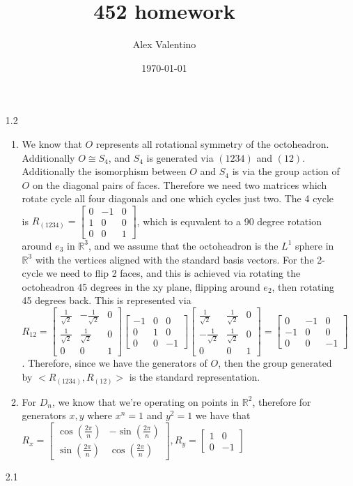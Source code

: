 \documentclass[12pt, letterpaper]{article}
\date{\today}
\author{Alex Valentino}
\title{452 homework}
\newcommand{\R}{\mathbb{R}}
\begin{document}
\begin{enumerate}
	\item[1.2]
	\begin{enumerate}
		\item We know that $O$ represents all rotational symmetry 
		of the octoheadron.  Additionally $O \cong S_4$, and 
		$S_4$ is generated via $(1234)$ and $(12)$.  Additionally 
		the isomorphism between $O$ and $S_4$ is via the 
		group action of $O$ on the diagonal pairs of faces.  
		Therefore we need two matrices which rotate cycle all 
		four diagonals and one which cycles just two.  
		The 4 cycle is $R_{(1234)} = \begin{bmatrix}
		0 & -1 & 0\\ 1 & 0 & 0\\ 0 & 0 & 1
\end{bmatrix}		 $, which is equvalent to a 90 degree rotation around 
$e_3$ in $\R^3$, and we assume that the octoheadron is the 
$L^1$ sphere in $\R^3$ with the vertices aligned with the standard basis vectors.  For the 2-cycle we need to flip 2 faces, and this 
is achieved via rotating the octoheadron 45 degrees in the 
xy plane, flipping around $e_2$, then rotating 45 degrees back. 
This is represented via
$R_{12} = \begin{bmatrix}
\frac{1}{\sqrt{2}} & -\frac{1}{\sqrt{2}} & 0 \\
\frac{1}{\sqrt{2}} & \frac{1}{\sqrt{2}} & 0\\
0 & 0 & 1
\end{bmatrix} \begin{bmatrix}
-1 & 0 & 0\\ 
0 & 1 & 0\\
0 & 0 & -1
\end{bmatrix}\begin{bmatrix}

\frac{1}{\sqrt{2}} & \frac{1}{\sqrt{2}} & 0 \\
-\frac{1}{\sqrt{2}} & \frac{1}{\sqrt{2}} & 0\\
0 & 0 & 1
\end{bmatrix} = \begin{bmatrix}
0 & -1 & 0\\ -1 & 0 & 0\\ 0 & 0 & -1
\end{bmatrix} $.  Therefore, since we have the generators of $O$, 
then the group generated by $<R_{(1234)}, R_{(12)}>$ is the 
standard representation.  
		\item For $D_n$, we know that we're operating on points in 
		$\R^2$, therefore for generators $x,y$ where 
		$x^n = 1$ and $y^2 =1$ we have that 
		$R_x = \begin{bmatrix}
		\cos(\frac{2\pi}{n}) & -\sin(\frac{2\pi}{n})\\
		\sin(\frac{2\pi}{n}) & \cos(\frac{2\pi}{n})
\end{bmatrix}, R_y = \begin{bmatrix}
1 & 0\\ 0 & -1
\end{bmatrix} $
	\end{enumerate}
	\item[2.1] 
\end{enumerate}
\end{document}
